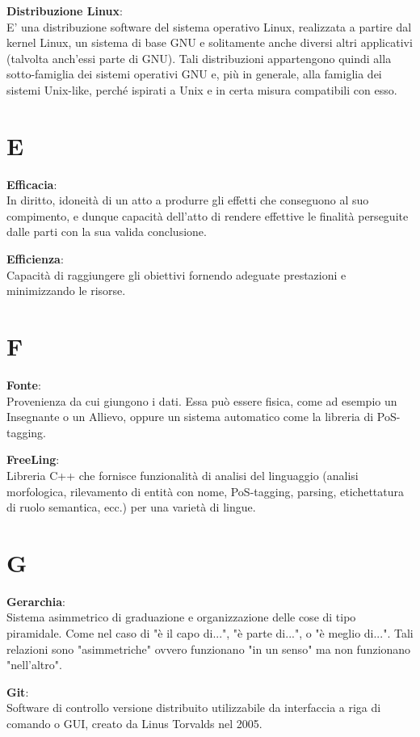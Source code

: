 \documentclass[a4paper, oneside, openany, dvipsnames, table]{article}
\begin{document}
\textbf{Distribuzione Linux}:\\	E' una distribuzione software del sistema operativo Linux, realizzata a partire dal kernel Linux, un sistema di base GNU e solitamente anche diversi altri applicativi (talvolta anch'essi parte di GNU). Tali distribuzioni appartengono quindi alla sotto-famiglia dei sistemi operativi GNU e, più in generale, alla famiglia dei sistemi Unix-like, perché ispirati a Unix e in certa misura compatibili con esso.


\newpage
\section{E}
\textbf{Efficacia}:\\ In diritto, idoneità di un atto a produrre gli effetti che conseguono al suo compimento, e dunque capacità dell'atto di rendere effettive le finalità perseguite dalle parti con la sua valida conclusione. 

\textbf{Efficienza}:\\ Capacità di raggiungere gli obiettivi fornendo adeguate prestazioni e minimizzando le risorse.

\newpage
\section{F}
\textbf{Fonte}:\\ Provenienza da cui giungono i dati. Essa può essere fisica, come ad esempio un Insegnante o un Allievo, oppure un sistema automatico come la libreria di PoS-tagging.

\textbf{FreeLing}:\\ Libreria C++ che fornisce funzionalità di analisi del linguaggio (analisi morfologica, rilevamento di entità con nome, PoS-tagging, parsing, etichettatura di ruolo semantica, ecc.) per una varietà di lingue.

\newpage
\section{G}
\textbf{Gerarchia}:\\ Sistema asimmetrico di graduazione e organizzazione delle cose di tipo piramidale.  
Come nel caso di "è il capo di...", "è parte di...", o "è meglio di...". Tali relazioni sono "asimmetriche" ovvero funzionano "in un senso" ma non funzionano "nell'altro".

\textbf{Git}:\\	 Software di controllo versione distribuito utilizzabile da interfaccia a riga di comando o GUI, creato da Linus Torvalds nel 2005.
\end{document}
